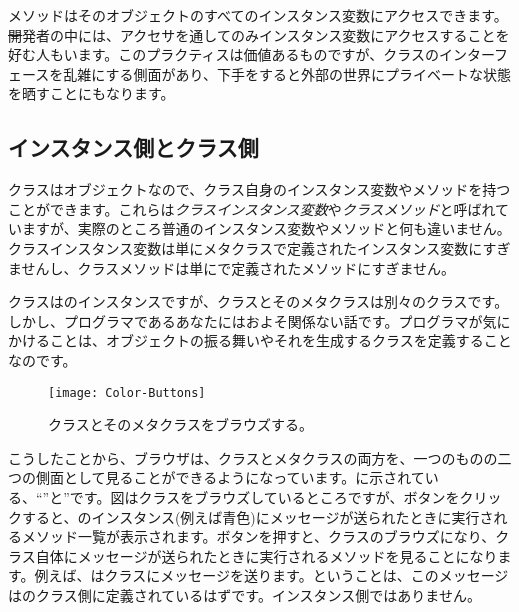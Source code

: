 \documentclass[a4paper,10pt,twoside]{book}
\begin{document}
メソッドはそのオブジェクトのすべてのインスタンス変数にアクセスできます。\st 開発者の中には、アクセサを通してのみインスタンス変数にアクセスすることを好む人もいます。このプラクティスは価値あるものですが、クラスのインターフェースを乱雑にする側面があり、下手をすると外部の世界にプライベートな状態を晒すことにもなります。

\subsection{インスタンス側とクラス側}

クラスはオブジェクトなので、クラス自身のインスタンス変数やメソッドを持つことができます。これらは\emph{クラスインスタンス変数}や\emph{クラスメソッド}と呼ばれていますが、実際のところ普通のインスタンス変数やメソッドと何も違いません。クラスインスタンス変数は単にメタクラスで定義されたインスタンス変数にすぎませんし、クラスメソッドは単にで定義されたメソッドにすぎません。

クラスはのインスタンスですが、クラスとそのメタクラスは別々のクラスです。しかし、プログラマであるあなたにはおよそ関係ない話です。プログラマが気にかけることは、オブジェクトの振る舞いやそれを生成するクラスを定義することなのです。

\begin{figure}[htb]
\begin{center}
\texttt{[image: Color-Buttons]}
\caption{クラスとそのメタクラスをブラウズする。
}
\end{center}
\end{figure}

こうしたことから、ブラウザは、クラスとメタクラスの両方を、一つのものの二つの側面として見ることができるようになっています。に示されている、``''と''です。図はクラスをブラウズしているところですが、ボタンをクリックすると、のインスタンス(例えば青色)にメッセージが送られたときに実行されるメソッド一覧が表示されます。ボタンを押すと、クラスのブラウズになり、クラス自体にメッセージが送られたときに実行されるメソッドを見ることになります。例えば、はクラスにメッセージを送ります。ということは、このメッセージはのクラス側に定義されているはずです。インスタンス側ではありません。
\end{document}
